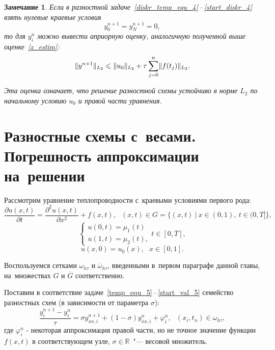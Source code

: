 \documentclass[11pt,a4paper,twoside]{report}
\numberwithin{equation}{section}
\theoremstyle{definition}
\theoremstyle{plain}
\newtheorem*{note*}{Замечание}
\DeclarePairedDelimiter\norm{\lVert}{\rVert}
\begin{document}
%
\begin{note*}
%
    Если в разностной задаче~\eqref{diskr_temp_equ_4}\,--\,\eqref{start_diskr_4}
    взять нулевые краевые условия
    $$
        y_0^{n+1} = y_N^{n+1} = 0,
    $$
    то для $y_i^n$ можно вывести априорную оценку, аналогичную полученной
    выше оценке~\eqref{z_estim}:
    $$
        \norm{y^{n+1}}_{L_2} \leqslant \norm{u_0}_{L_2} +
        \tau\sum_{j=0}^n \norm{f(t_j)}_{L_2}.
    $$

    Эта оценка означает, что решение разностной схемы устойчиво в норме $L_2$
    по начальному условию $u_0$ и правой части уравнения.
%
\end{note*}
%

%
\section{Разностные схемы с~весами. Погрешность аппроксимации на~решении}
%
Рассмотрим уравнение теплопроводности с~краевыми условиями первого рода:
%
\begin{equation}
%
    \label{temp_equ_5}
    \frac{\partial u(x,t)}{\partial t} =
    \frac{\partial^2u(x,t)}{\partial x^2} + f(x,t),
    ~~~(x,t) \in G = \{(x, t)~|~x \in (0,1),~t\in (0,T]\},
%
\end{equation}
%
%
\begin{equation}
%
    \label{bord_5}
    \begin{cases}
        u(0,t) = \mu_1(t) \\
        u(1,t) = \mu_2(t),
    \end{cases}
    t\in [0,T],
%
\end{equation}
%
%
\begin{equation}
%
    \label{start_val_5}
    u(x,0) = u_0(x),~~~x\in[0,1].
%
\end{equation}

Воспользуемся сетками $\omega_{h \tau}$ и $\overline{\omega}_{h \tau}$,
введенными в~первом параграфе данной главы, на~множествах $G$ и
$\overline{G}$ соответственно.

Поставим в соответствие задаче~\eqref{temp_equ_5}\,--\,\eqref{start_val_5} семейство
разностных схем (в зависимости от параметра $\sigma$):
%
\begin{equation}
%
    \label{diskr_family}
    \dfrac{y_i^{n+1} - y_i^n}{\tau} = \sigma y_{\overline{x}x,i}^{n+1} +
    \left(1 - \sigma\right) y_{\overline{x}x,i}^n + \varphi_i^n, ~~~(x_i,t_n)\in\omega_{h \tau},
%
\end{equation}
%
где $\varphi_i^n$ - некоторая аппроксимация правой части, но не точное значение
функции $f(x,t)$ в соответствующем узле, $\sigma\in\mathbb{R}$~"--- весовой множитель.
\end{document}
